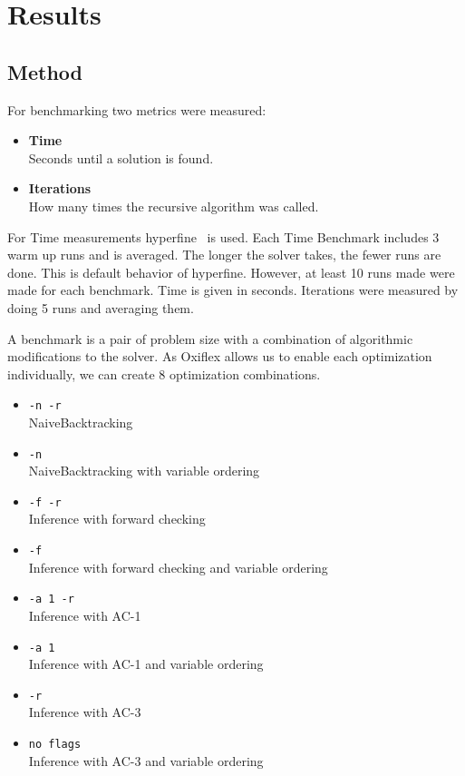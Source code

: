 
\chapter{Results} \label{chap:result}

\section{Method}

For benchmarking two metrics were measured:

\begin{itemize}
	\item \textbf{Time} \\
	      Seconds until a solution is found.
	\item \textbf{Iterations} \\
	      How many times the recursive algorithm was called.
\end{itemize}

For Time measurements hyperfine~\cite{hyperfine:2023} is used. Each Time Benchmark includes 3 warm up runs and is averaged. The longer the solver takes, the fewer runs are done. This is default behavior of hyperfine. However, at least 10 runs made were made for each benchmark. Time is given in seconds. Iterations were measured by doing 5 runs and averaging them.

A benchmark is a pair of problem size with a combination of algorithmic modifications to the solver. As Oxiflex allows us to enable each optimization individually, we can create 8 optimization combinations.

\begin{itemize}
	\item \verb|-n -r| \\
	      NaiveBacktracking
	\item \verb|-n| \\
	      NaiveBacktracking with variable ordering
	\item \verb|-f -r| \\
	      Inference with forward checking
	\item \verb|-f| \\
	      Inference with forward checking and variable ordering
	\item \verb|-a 1 -r| \\
	      Inference with AC-1
	\item \verb|-a 1| \\
	      Inference with AC-1 and variable ordering
	\item \verb|-r| \\
	      Inference with AC-3
	\item \verb|no flags| \\
	      Inference with AC-3 and variable ordering
\end{itemize}

